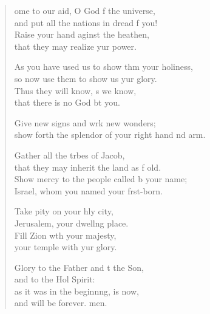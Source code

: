 \begin{verse}
  \begin{patverse}
ome to our aid, O God f the universe,\Med\\
and put all the nations in dread f you!\\
Raise your hand aginst the heathen,\Med\\
that they may realize yur power.

As you have used us to show thm your holiness,\Med\\
so now use them to show us yur glory.\\
Thus they will know, s we know,\Med\\
that there is no God bt you.

Give new signs and wrk new wonders;\Med\\
show forth the splendor of your right hand nd arm.

Gather all the tr\pointup{\i}bes of Jacob,\Med\\
that they may inherit the land as f old.\\
Show mercy to the people called b your name;\Med\\
Israel, whom you named your f\pointup{\i}rst-born.

Take pity on your hly city,\Med\\
Jerusalem, your dwell\pointup{\i}ng place.\\
Fill Zion w\pointup{\i}th your majesty,\Med\\
your temple with yur glory.

Glory to the Father and t the Son,\Med\\
and to the Hol Spirit:\\
as it was in the beginn\pointup{\i}ng, is now,\Med\\
and will be forever. men. 
  \end{patverse}
\end{verse}
